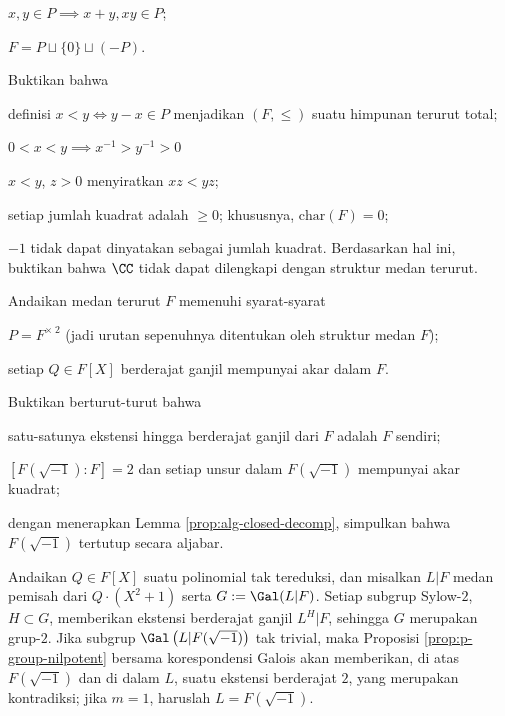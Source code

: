 \begin{Exercises}
		\begin{compactitem}
			\item $x, y \in P \implies x+y, xy \in P$;
			\item $F = P \sqcup \{0\} \sqcup (-P)$.
		\end{compactitem}
		Buktikan bahwa
		\begin{compactenum}[(i)]
			\item definisi $x < y \iff y-x \in P$ menjadikan $(F, \leq)$ suatu himpunan terurut total;
			\item $0 < x < y \implies x^{-1} > y^{-1} > 0$
			\item $x < y$, $z > 0$ menyiratkan $xz < yz$;
			\item setiap jumlah kuadrat adalah $\geq 0$; khususnya, $\text{char}(F)=0$;
			\item $-1$ tidak dapat dinyatakan sebagai jumlah kuadrat. Berdasarkan hal ini, buktikan bahwa $\CC$ tidak dapat dilengkapi dengan struktur medan terurut.
		\end{compactenum}
	\item Andaikan medan terurut $F$ memenuhi syarat-syarat
		\begin{inparaenum}[(a)]
			\item $P = F^{\times\; 2}$ (jadi urutan sepenuhnya ditentukan oleh struktur medan $F$);
			\item setiap $Q \in F[X]$ berderajat ganjil mempunyai akar dalam $F$.
		\end{inparaenum}
		Buktikan berturut-turut bahwa
		\begin{compactenum}[(i)]
			\item satu-satunya ekstensi hingga berderajat ganjil dari $F$ adalah $F$ sendiri;
			\item $\left[ F(\sqrt{-1}) : F \right]=2$ dan setiap unsur dalam $F(\sqrt{-1})$ mempunyai akar kuadrat;
			\item dengan menerapkan Lemma \ref{prop:alg-closed-decomp}, simpulkan bahwa $F(\sqrt{-1})$ tertutup secara aljabar.
		\end{compactenum}
		\begin{hint}
			Andaikan $Q \in F[X]$ suatu polinomial tak tereduksi, dan misalkan $L|F$ medan pemisah dari $Q \cdot (X^2+1)$ serta $G := \Gal(L|F)$. Setiap subgrup Sylow-$2$, $H \subset G$, memberikan ekstensi berderajat ganjil $L^H | F$, sehingga $G$ merupakan grup-$2$. Jika subgrup $\Gal\left( L|F(\sqrt{-1})\right)$ tak trivial, maka Proposisi \ref{prop:p-group-nilpotent} bersama korespondensi Galois akan memberikan, di atas $F(\sqrt{-1})$ dan di dalam $L$, suatu ekstensi berderajat $2$, yang merupakan kontradiksi; jika $m=1$, haruslah $L=F(\sqrt{-1})$.
		\end{hint}


\end{Exercises}

